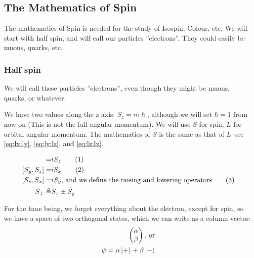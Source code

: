 \documentclass[]{article}
\newcommand\numberthis{\addtocounter{equation}{1}\tag{\theequation}}
\begin{document}
\subsection{The Mathematics of Spin}

The mathematics of Spin is needed for the study of Isospin, Colour, etc. We will start with half spin, and will call our particles ''electrons''. They could easily be muons, quarks, etc. 

\subsubsection{Half spin}

We will call these particles ''electrons'', even though they might be muons, quarks, or whatever.

We have two values along the z axis: $S_z = m \hslash$, although we will set $\hbar=1$ from now on (This is not the full angular momentum). We will use $S$ for spin, $L$ for orbital angular momentum. The mathematics of $S$ is the same as that of $L$--see \eqref{eq:lx:ly},  \eqref{eq:ly:lz}, and  \eqref{eq:lz:lx}.

\begin{align*}
	[S_x,S_y] =& i S_z \numberthis \label{eq:sx:sy}\\
	[S_y,S_z] =& i S_x  \numberthis \label{eq:sy:sz}\\
	[S_z,S_x] =& i S_y \text{, and we define the raising and lowering operators} \numberthis \label{eq:sz:sx}\\
	S_\pm \triangleq& S_x \pm S_y 
\end{align*}

For the time being, we forget everything about the electron, except for spin, so we have a space of two orthogonal states, which we can write as a column vector:
\begin{align*}
	\begin{pmatrix}
		\alpha\\
		\beta
	\end{pmatrix} \text{, or}\\
	\psi = \alpha\ket{+} + \beta\ket{-}
\end{align*}
\end{document}
